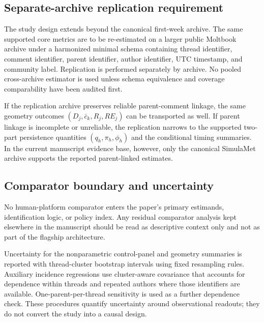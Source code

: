 \subsection{Separate-archive replication requirement}
\label{sec:methods:replication}

The study design extends beyond the canonical first-week archive. The same
supported core metrics are to be re-estimated on a larger public Moltbook
archive under a harmonized minimal schema containing thread identifier, comment
identifier, parent identifier, author identifier, UTC timestamp, and community
label. Replication is performed separately by archive. No pooled cross-archive
estimator is used unless schema equivalence and coverage comparability have been
audited first.

If the replication archive preserves reliable parent-comment linkage, the same
geometry outcomes \((D_j,\bar c_k,R_j,RE_j)\) can be transported as well. If
parent linkage is incomplete or unreliable, the replication narrows to the
supported two-part persistence quantities \((q_h,\pi_h,\phi_h)\) and the
conditional timing summaries. In the current manuscript evidence base, however,
only the canonical SimulaMet archive supports the reported parent-linked
estimates.

\subsection{Comparator boundary and uncertainty}
\label{sec:methods:comparison}
\label{sec:methods:uncertainty}

No human-platform comparator enters the paper's primary estimands,
identification logic, or policy index. Any residual comparator analysis kept
elsewhere in the manuscript should be read as descriptive context only and not
as part of the flagship architecture.

Uncertainty for the nonparametric control-panel and geometry summaries is
reported with thread-cluster bootstrap intervals using fixed resampling rules.
Auxiliary incidence regressions use cluster-aware covariance that accounts for
dependence within threads and repeated authors where those identifiers are
available. One-parent-per-thread sensitivity is used as a further dependence
check. These procedures quantify uncertainty around observational readouts; they
do not convert the study into a causal design.
